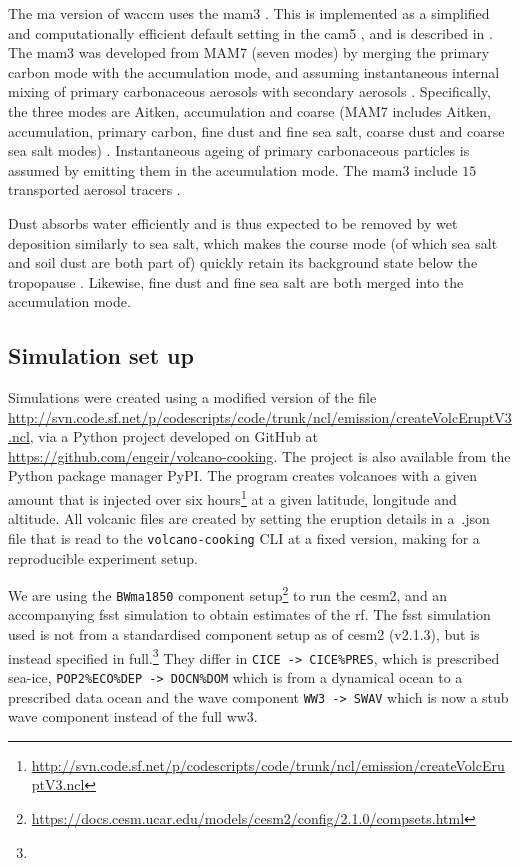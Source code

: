 \documentclass{ametsocV6.1}
\begin{document}
The \gls{ma} version of \gls{waccm} uses the \gls{mam3} \citep{gettleman2019}. This is
implemented as a simplified and computationally efficient default setting in the
\gls{cam5} \citep{liu2016}, and is described in \citet{liu2012}. The \gls{mam3} was
developed from MAM7 (seven modes) by merging the primary carbon mode with the
accumulation mode, and assuming instantaneous internal mixing of primary carbonaceous
aerosols with secondary aerosols \citep{liu2016}. Specifically, the three modes are
Aitken, accumulation and coarse (MAM7 includes Aitken, accumulation, primary carbon,
fine dust and fine sea salt, coarse dust and coarse sea salt modes) \citep{liu2016}.
Instantaneous ageing of primary carbonaceous particles is assumed by emitting them in
the accumulation mode. The \gls{mam3} include \(15\) transported aerosol tracers
\citep{liu2016}.

Dust absorbs water efficiently and is thus expected to be removed by wet deposition
similarly to sea salt, which makes the course mode (of which sea salt and soil dust are
both part of) quickly retain its background state below the tropopause \citep{liu2012}.
Likewise, fine dust and fine sea salt are both merged into the accumulation mode.

\subsection{Simulation set up}

Simulations were created using a modified version of the file
\url{http://svn.code.sf.net/p/codescripts/code/trunk/ncl/emission/createVolcEruptV3.ncl},
via a Python project developed on GitHub at
\url{https://github.com/engeir/volcano-cooking}. The project is also available from the
Python package manager PyPI\@. The program creates volcanoes with a given 
amount that is injected over six
hours\footnote{\url{http://svn.code.sf.net/p/codescripts/code/trunk/ncl/emission/createVolcEruptV3.ncl}}
at a given latitude, longitude and altitude. All volcanic  files are created by
setting the eruption details in a~.json file that is read to the
\texttt{volcano-cooking} CLI at a fixed version, making for a reproducible experiment
setup.

We are using the \texttt{BWma1850} component
setup\footnote{\url{https://docs.cesm.ucar.edu/models/cesm2/config/2.1.0/compsets.html}}
to run the \gls{cesm2}, and an accompanying \gls{fsst} simulation to obtain estimates of
the \gls{rf}. The \gls{fsst} simulation used is not from a standardised component setup
as of \gls{cesm2} (v2.1.3), but is instead specified in full.\footnote{\fssturl} They
differ in \texttt{CICE -> CICE\%PRES}, which is prescribed sea-ice,
\texttt{POP2\%ECO\%DEP -> DOCN\%DOM} which is from a dynamical ocean to a prescribed
data ocean and the wave component \texttt{WW3 -> SWAV} which is now a stub wave
component instead of the full \gls{ww3}.
\end{document}
